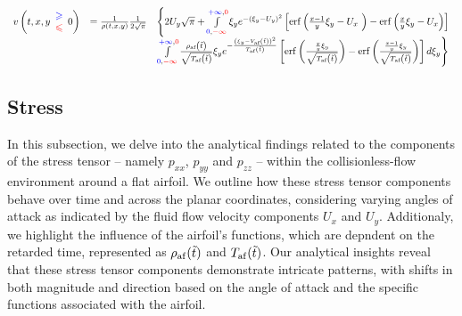 \begin{equation*}
\begin{array}{ r l l }
v\left( t,x,y\begin{array}{ c }
\textcolor[rgb]{0,0,1}{\geqslant }\\
\textcolor[rgb]{1,0,0}{\leqslant }
\end{array} 0\right) & =\frac{1}{\rho ( t,x,y)}\frac{1}{2\sqrt{\pi }} & \left\{2U_{y}\sqrt{\pi } +\int\limits _{\textcolor[rgb]{0,0,1}{0} ,\textcolor[rgb]{1,0,0}{-\infty }}^{\textcolor[rgb]{0,0,1}{+\infty } ,\textcolor[rgb]{1,0,0}{0}} \xi _{y} e^{-( \xi _{y} -U_{y})^{2}}\left[\mathrm{erf}\left(\frac{x-1}{y} \xi _{y} -U_{x} \ \right) -\mathrm{erf}\left(\frac{x}{y} \xi _{y} -U_{x}\right)\right]\right. \\
 &  & \left. \int\limits _{\textcolor[rgb]{0,0,1}{0} ,\textcolor[rgb]{1,0,0}{-\infty }}^{\textcolor[rgb]{0,0,1}{+\infty } ,\textcolor[rgb]{1,0,0}{0}}\frac{\rho _{\text{af}}\left(\tilde{t}\right)}{\sqrt{T_{\text{af}}\left(\tilde{t}\right)}} \xi _{y} e^{-\frac{\left( \xi _{y} -V_{\text{af}}\left(\tilde{t}\right)\right)^{2}}{T_{\text{af}}\left(\tilde{t}\right)}}\left[\mathrm{erf}\left(\frac{\frac{x}{y} \xi _{y}}{\sqrt{T_{\text{af}}\left(\tilde{t}\right)}}\right) -\mathrm{erf}\left(\frac{\frac{x-1}{y} \xi _{y}}{\sqrt{T_{\text{af}}\left(\tilde{t}\right)}}\right)\right] d\xi _{y}\right\}
\end{array}
\end{equation*}

\subsection{Stress}
In this subsection, we delve into the analytical findings related to the components of the stress tensor -- namely $p_{xx}$, $p_{yy}$ and $p_{zz}$ -- within the collisionless-flow environment around a flat airfoil. We outline how these stress tensor components behave over time and across the planar coordinates, considering varying angles of attack as indicated by the fluid flow velocity components $U_x$ and $U_y$. Additionaly, we highlight the influence of the airfoil's functions, which are depndent on the retarded time, represented as $\rho_{\mathrm{af}} (\tilde{t})$ and $T_{\mathrm{af}} (\tilde{t})$. Our analytical insights reveal that these stress tensor components demonstrate intricate patterns, with shifts in both magnitude and direction based on the angle of attack and the specific functions associated with the airfoil.

